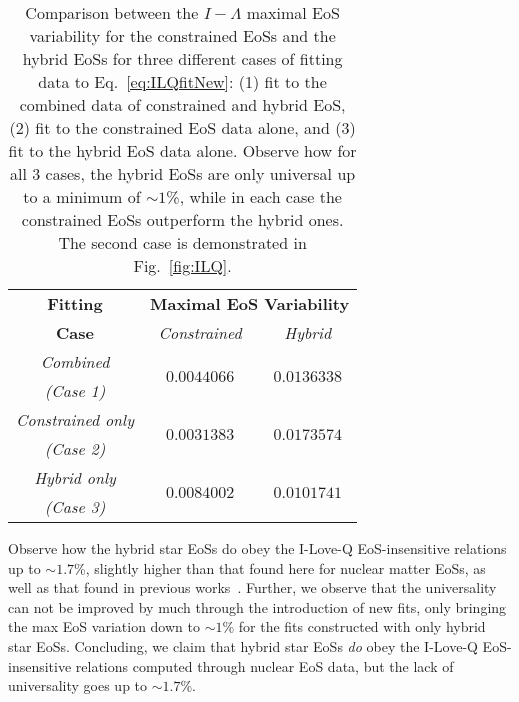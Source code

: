 \documentclass[prd,twocolumn,nofootinbib,superscriptaddress,amsmath,amssymb]{revtex4-1}
\begin{document}
\begin{table}
\centering
\caption{
Comparison between the $I-\Lambda$ maximal EoS variability for the constrained EoSs and the hybrid EoSs for three different cases of fitting data to Eq.~\ref{eq:ILQfitNew}: (1) fit to the combined data of constrained and hybrid EoS, (2) fit to the constrained EoS data alone, and (3) fit to the hybrid EoS data alone.
Observe how for all 3 cases, the hybrid EoSs are only universal up to a minimum of $\sim1$\%, while in each case the constrained EoSs outperform the hybrid ones.
The second case is demonstrated in Fig.~\ref{fig:ILQ}.
}\label{tab:hybridCompare}
\begin{tabular}{ c  || c c } 
 \hline
 \hline
 \textbf{Fitting} & \multicolumn{2}{c}{\textbf{Maximal EoS Variability}} \\
 \cline{2-3}
 \textbf{Case} &  \multicolumn{1}{c|}{\emph{Constrained}} & \emph{Hybrid}\\
 \hline
 \emph{Combined} &  \multirow{2}{*}{$0.0044066$} & \multirow{2}{*}{$0.0136338$}\\
 \emph{(Case 1)} & &\\
 \cline{1-1}
 \emph{Constrained only} & \multirow{2}{*}{$0.0031383$} & \multirow{2}{*}{$0.0173574$}\\
  \emph{(Case 2)} & &\\
  \cline{1-1}
 \emph{Hybrid only} & \multirow{2}{*}{$0.0084002$} & \multirow{2}{*}{$0.0101741$}\\
  \emph{(Case 3)} & &\\
  \cline{1-1}
\hline
\hline
\end{tabular}
\end{table}

Observe how the hybrid star EoSs do obey the I-Love-Q EoS-insensitive relations up to $\sim1.7$\%, slightly higher than that found here for nuclear matter EoSs, as well as that found in previous works~\cite{Yagi:ILQ}.
Further, we observe that the universality can not be improved by much through the introduction of new fits, only bringing the max EoS variation down to $\sim1$\% for the fits constructed with only hybrid star EoSs.
Concluding, we claim that hybrid star EoSs \emph{do} obey the I-Love-Q EoS-insensitive relations computed through nuclear EoS data, but the lack of universality goes up to $\sim1.7$\%. 

{}
\end{document}
